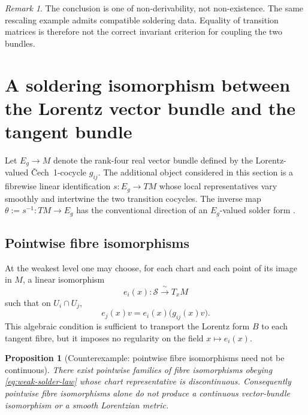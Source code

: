 \documentclass[11pt,a4paper]{article}
\newtheorem{proposition}[theorem]{Proposition}
\theoremstyle{definition}
\theoremstyle{remark}
\newtheorem{remark}[theorem]{Remark}
\newcommand{\Smodel}{\mathcal{S}}
\newcommand{\Cech}{\ifmmode\text{\v{C}ech}\else\v{C}ech\fi}
\begin{document}
\begin{remark}
The conclusion is one of non-derivability, not non-existence.  The same rescaling example admits compatible soldering data.  Equality of transition matrices is therefore not the correct invariant criterion for
coupling the two bundles.
\end{remark}

\clearpage
\section{A soldering isomorphism between the Lorentz vector bundle and the tangent bundle}
\label{sec:solder}

Let \(E_g\to M\) denote the rank-four real vector bundle defined by the
Lorentz-valued \Cech\ 1-cocycle \(g_{ij}\).  The additional object considered in
this section is a fibrewise linear identification \(s:E_g\to TM\) whose local
representatives vary smoothly and intertwine the two transition cocycles.  The
inverse map \(\theta:=s^{-1}:TM\to E_g\) has the conventional direction of an
\(E_g\)-valued solder form \cite{KobayashiNomizu,Nakahara}.

\subsection{Pointwise fibre isomorphisms}

At the weakest level one may choose, for each chart and each point of its image in \(M\), a
linear isomorphism
\[
   e_i(x):\Smodel\xrightarrow{\;\sim\;}T_xM
\tag{7.1}
\]
such that on \(U_i\cap U_j\),
\[
   e_j(x)v
   =
   e_i(x)\bigl(g_{ij}(x)v\bigr).
\tag{7.2}\label{eq:weak-solder-law}
\]
This algebraic condition is sufficient to transport the Lorentz form \(B\) to each tangent fibre, but it imposes no regularity on the field
\(x\mapsto e_i(x)\).

\begin{proposition}[Counterexample: pointwise fibre isomorphisms need not be continuous]
\label{prop:weak-solder}
There exist pointwise families of fibre isomorphisms obeying \eqref{eq:weak-solder-law} whose chart
representative is discontinuous.  Consequently pointwise fibre isomorphisms alone do not produce a continuous vector-bundle isomorphism or a smooth Lorentzian metric.
\end{proposition}
\end{document}
